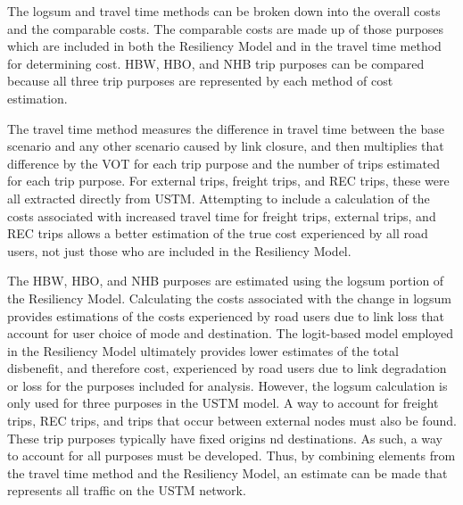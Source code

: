 The logsum and travel time methods can be broken down into the overall costs and the
comparable costs. The comparable costs are made up of those purposes which are
included in both the Resiliency Model and in the travel time method for determining
cost. HBW, HBO, and NHB trip purposes can be compared because all three trip purposes
are represented by each method of cost estimation.

The travel time method measures the difference in travel time between the base scenario and any other scenario caused by link closure, and then multiplies that
difference by the VOT for each trip purpose and the number of trips estimated for
each trip purpose. For external trips, freight trips, and REC trips, these were all
extracted directly from USTM. Attempting to include a calculation of the costs
associated with increased travel time for freight trips, external trips, and REC
trips allows a better estimation of the true cost experienced by all road users, not
just those who are included in the Resiliency Model.

The HBW, HBO, and NHB purposes are estimated using the logsum portion of the
Resiliency Model. Calculating the costs associated with the change in logsum
provides estimations of the costs experienced by road users due to link loss
that account for user choice of mode and destination. The logit-based model
employed in the Resiliency Model ultimately provides lower estimates of the
total disbenefit, and therefore cost, experienced by road users due to link
degradation or loss for the purposes included for analysis. However, the
logsum calculation is only used for three purposes in the USTM model. A way to
account for freight trips, REC trips, and trips that occur between external
nodes must also be found. These trip purposes typically have fixed origins
nd destinations. As such, a way to account for all purposes must be developed.
Thus, by combining elements from the travel time method and the Resiliency Model, an estimate can be made that represents all traffic on the USTM network.


